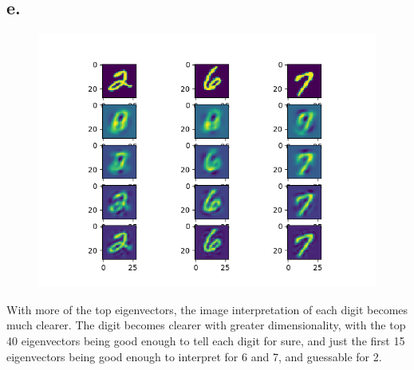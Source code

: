 \documentclass{article}
\newcommand{\1}{\mathbf{1}}
\begin{document}
{\subsection*{e.}

\begin{figure}[!hb]
  \centering
  \includegraphics[width=130mm]{../hw4-code/results/a3_e.png}
\end{figure}

With more of the top eigenvectors, the image interpretation of each digit becomes much clearer. The digit becomes clearer with greater dimensionality, with the top 40 eigenvectors being good enough to tell each digit for sure, and just the first 15 eigenvectors being good enough to interpret for 6 and 7, and guessable for 2.

}
\end{document}
